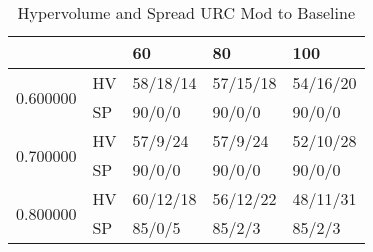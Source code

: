 \begin{table}
\caption{Hypervolume and Spread URC Mod to Baseline}
\begin{tabular}{lllll}
\toprule
 &  & 60 & 80 & 100 \\
\midrule
\multirow[t]{2}{*}{0.600000} & HV & 58/18/14 & 57/15/18 & 54/16/20 \\
 & SP & 90/0/0 & 90/0/0 & 90/0/0 \\
\cline{1-5}
\multirow[t]{2}{*}{0.700000} & HV & 57/9/24 & 57/9/24 & 52/10/28 \\
 & SP & 90/0/0 & 90/0/0 & 90/0/0 \\
\cline{1-5}
\multirow[t]{2}{*}{0.800000} & HV & 60/12/18 & 56/12/22 & 48/11/31 \\
 & SP & 85/0/5 & 85/2/3 & 85/2/3 \\
\cline{1-5}
\bottomrule
\end{tabular}
\end{table}
